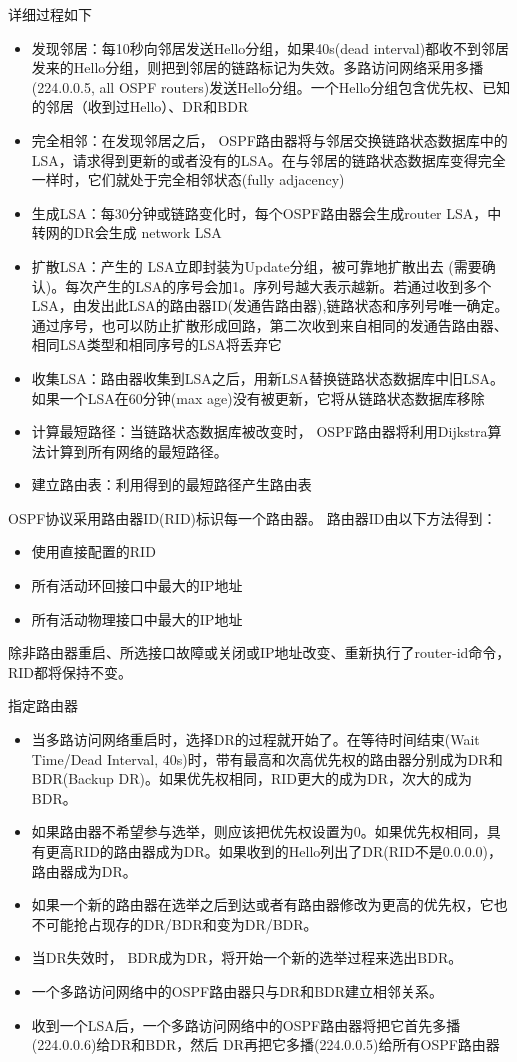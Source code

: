 详细过程如下
\begin{itemize}
	\item 发现邻居：每10秒向邻居发送Hello分组，如果40s(dead interval)都收不到邻居发来的Hello分组，则把到邻居的链路标记为失效。多路访问网络采用多播(224.0.0.5, all OSPF routers)发送Hello分组。一个Hello分组包含优先权、已知的邻居（收到过Hello）、DR和BDR
	\item 完全相邻：在发现邻居之后， OSPF路由器将与邻居交换链路状态数据库中的LSA，请求得到更新的或者没有的LSA。在与邻居的链路状态数据库变得完全一样时，它们就处于完全相邻状态(fully adjacency)
	\item 生成LSA：每30分钟或链路变化时，每个OSPF路由器会生成router LSA，中转网的DR会生成	network LSA
	\item 扩散LSA：产生的 LSA立即封装为Update分组，被可靠地扩散出去 (需要确认)。每次产生的LSA的序号会加1。序列号越大表示越新。若通过收到多个LSA，由发出此LSA的路由器ID(发通告路由器),链路状态和序列号唯一确定。通过序号，也可以防止扩散形成回路，第二次收到来自相同的发通告路由器、相同LSA类型和相同序号的LSA将丢弃它
	\item 收集LSA：路由器收集到LSA之后，用新LSA替换链路状态数据库中旧LSA。如果一个LSA在60分钟(max age)没有被更新，它将从链路状态数据库移除
	\item 计算最短路径：当链路状态数据库被改变时， OSPF路由器将利用Dijkstra算法计算到所有网络的最短路径。
	\item 建立路由表：利用得到的最短路径产生路由表
\end{itemize}

OSPF协议采用路由器ID(RID)标识每一个路由器。
路由器ID由以下方法得到：
\begin{itemize}
	\item 使用直接配置的RID
	\item 所有活动环回接口中最大的IP地址
	\item 所有活动物理接口中最大的IP地址
\end{itemize}
除非路由器重启、所选接口故障或关闭或IP地址改变、重新执行了router-id命令，RID都将保持不变。


指定路由器
\begin{itemize}
	\item 当多路访问网络重启时，选择DR的过程就开始了。在等待时间结束(Wait Time/Dead Interval, 40s)时，带有最高和次高优先权的路由器分别成为DR和BDR(Backup DR)。如果优先权相同，RID更大的成为DR，次大的成为BDR。
	\item 如果路由器不希望参与选举，则应该把优先权设置为0。如果优先权相同，具有更高RID的路由器成为DR。如果收到的Hello列出了DR(RID不是0.0.0.0)，路由器成为DR。
	\item 如果一个新的路由器在选举之后到达或者有路由器修改为更高的优先权，它也不可能抢占现存的DR/BDR和变为DR/BDR。
	\item 当DR失效时， BDR成为DR，将开始一个新的选举过程来选出BDR。
	\item 一个多路访问网络中的OSPF路由器只与DR和BDR建立相邻关系。
	\item 收到一个LSA后，一个多路访问网络中的OSPF路由器将把它首先多播(224.0.0.6)给DR和BDR，然后 DR再把它多播(224.0.0.5)给所有OSPF路由器
\end{itemize}

